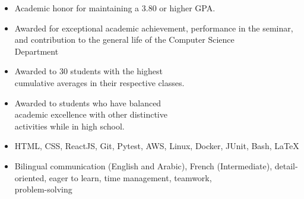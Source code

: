 \documentclass[10pt,a4paper,ragged2e]{altacv}
\begin{document}
\begin{itemize}
  \item Academic honor for maintaining a 3.80 or higher GPA.
\end{itemize}
\smallskip
{}
\begin{itemize}
  \item Awarded for exceptional academic achievement, performance in the
        seminar, and contribution to the general life of the Computer Science \\
        Department
\end{itemize}
\smallskip
{}
\begin{itemize}
  \item Awarded to 30 students with the highest \\ cumulative averages in their respective classes.
\end{itemize}
\smallskip
{}
\begin{itemize}
  \item Awarded to students who have balanced \\ academic excellence with other
        distinctive \\ activities while in high school.
\end{itemize}
\smallskip


\smallskip
\smallskip
{}
\begin{itemize}
  \item HTML, CSS, ReactJS, Git, Pytest, AWS, Linux, Docker, JUnit, Bash, \LaTeX
\end{itemize}
\smallskip
{}
\begin{itemize}
  \item Bilingual communication (English and Arabic), French (Intermediate),
        detail-oriented, eager to learn, time management, teamwork, \\ problem-solving
\end{itemize}








\end{document}

